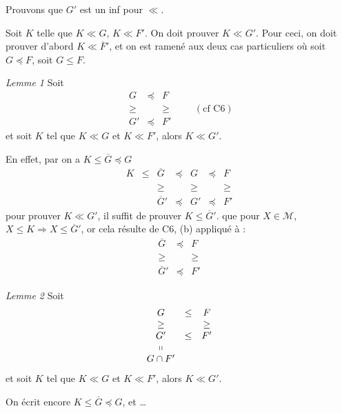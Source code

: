 \documentclass[11pt,a4paper]{article}
\begin{document}
\struck{\ill{}} Prouvons que $G'$ est un inf pour $\ll$.

Soit $K$ telle que $K \ll G$, $K \ll F'$. On doit prouver $K \ll G'$. Pour ceci, on doit prouver d'abord $K \ll \overline{F}'$, et on est ramené aux deux cas particuliers où soit $G \preccurlyeq F$, soit $G \leq F$. \ill{}

\emph{Lemme 1} \quad Soit
\[
  \begin{array}{ccc}
    G & \preccurlyeq & F \\
    \geq & & \geq \\
    G' & \preccurlyeq & F'
  \end{array}
  \qquad (\text{cf C6})
\]
et soit $K$ tel que $K \ll G$ et $K \ll F'$, alors $K \ll G'$.

En effet, par  \add{\ill{}} on a $K \leq \overline{G} \preccurlyeq G$
\[
  \begin{array}{ccccccc}
    K & \leq & \overline{G} & \preccurlyeq & G & \preccurlyeq & F \\
    & & \geq & & \geq & & \geq \\
    & & \overline{G}' & \preccurlyeq & G' & \preccurlyeq & F'
  \end{array}
\]
pour prouver $K \ll G'$, il suffit de prouver $K \leq \overline{G}'$.  \ill{} que pour $X \in \mathcal{M}$, $X \leq K \Longrightarrow X \leq \overline{G}'$, or cela résulte de C6, (b) appliqué à :
\[
  \begin{array}{ccc}
    \overline{G} & \preccurlyeq & F \\
    \geq & & \geq \\
    \overline{G}' & \preccurlyeq & F'
  \end{array}
\]

\emph{Lemme 2} \quad Soit
\[
  \begin{array}{ccc}
    G & \leq & F \\
    \geq & & \geq \\
    G' & \leq & F' \\
    \shortparallel & & \\
    G \cap F' & &
  \end{array}
\]
et soit $K$ tel que $K \ll G$ et $K \ll F'$, alors $K \ll G'$.

On écrit encore $K \leq \overline{G} \preccurlyeq G$, et …
\end{document}
